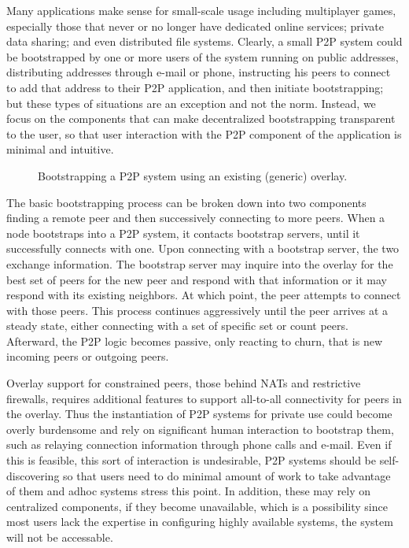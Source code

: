 \documentclass[conference]{IEEEtran}
\begin{document}
Many applications make sense for small-scale usage including multiplayer games,
especially those that never or no longer have dedicated online services;
private data sharing; and even distributed file systems.  Clearly, a small P2P
system could be bootstrapped by one or more users of the system running on
public addresses, distributing addresses through e-mail or phone, instructing
his peers to connect to add that address to their P2P application, and then
initiate bootstrapping; but these types of situations are an exception and not
the norm.  Instead, we focus on the components that can make decentralized
bootstrapping transparent to the user, so that user interaction with the P2P
component of the application is minimal and intuitive.

\begin{figure*}[h!t!]
\centering
{}
\caption{Bootstrapping a P2P system using an existing (generic) overlay.}
\label{fig:bootstrap}
\end{figure*}

The basic bootstrapping process can be broken down into two components finding
a remote peer and then successively connecting to more peers.  When a node
bootstraps into a P2P system, it contacts bootstrap servers, until it
successfully connects with one.  Upon connecting with a bootstrap server, the
two exchange information.  The bootstrap server may inquire into the overlay
for the best set of peers for the new peer and respond with that information or
it may respond with its existing neighbors.  At which point, the peer attempts
to connect with those peers.  This process continues aggressively until the
peer arrives at a steady state, either connecting with a set of specific set or
count peers.  Afterward, the P2P logic becomes passive, only reacting to churn,
that is new incoming peers or outgoing peers.

Overlay support for constrained peers, those behind NATs and restrictive
firewalls, requires additional features to support all-to-all connectivity for
peers in the overlay.  Thus the instantiation of P2P systems for private use
could become overly burdensome and rely on significant human interaction to
bootstrap them, such as relaying connection information through phone calls and
e-mail.  Even if this is feasible, this sort of interaction is undesirable, P2P
systems should be self-discovering so that users need to do minimal amount of
work to take advantage of them and adhoc systems stress this point.  In
addition, these may rely on centralized components, if they become unavailable,
which is a possibility since most users lack the expertise in configuring
highly available systems, the system will not be accessable.
\end{document}
